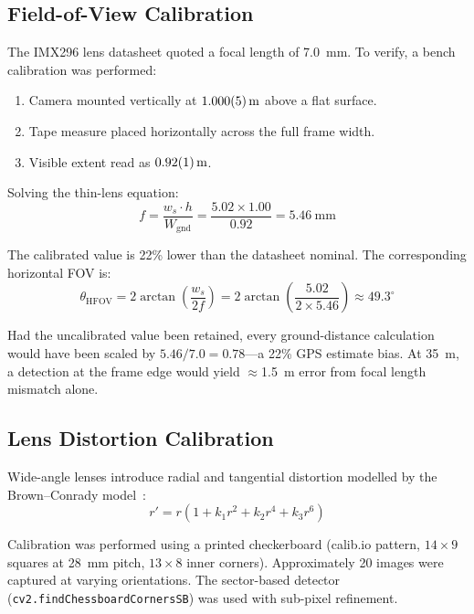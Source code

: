 \documentclass[10pt,a4paper]{article}
\begin{document}
\subsection{Field-of-View Calibration}

The IMX296 lens datasheet quoted a focal length of \SI{7.0}{\milli\metre}. To verify, a bench calibration was performed:
\begin{enumerate}
    \item Camera mounted vertically at $\SI{1.000 \pm 0.005}{\metre}$ above a flat surface.
    \item Tape measure placed horizontally across the full frame width.
    \item Visible extent read as $\SI{0.92 \pm 0.01}{\metre}$.
\end{enumerate}

Solving the thin-lens equation:
\begin{equation}
    f = \frac{w_s \cdot h}{W_{\mathrm{gnd}}} = \frac{5.02 \times 1.00}{0.92} = \SI{5.46}{\milli\metre}
\end{equation}

The calibrated value is 22\% lower than the datasheet nominal. The corresponding horizontal FOV is:
\begin{equation}
    \theta_{\mathrm{HFOV}} = 2\arctan\!\left(\frac{w_s}{2f}\right) = 2\arctan\!\left(\frac{5.02}{2 \times 5.46}\right) \approx 49.3^{\circ}
\end{equation}

Had the uncalibrated value been retained, every ground-distance calculation would have been scaled by $5.46/7.0 = 0.78$---a 22\% GPS estimate bias. At \SI{35}{\metre}, a detection at the frame edge would yield ${\approx}$\SI{1.5}{\metre} error from focal length mismatch alone.

\subsection{Lens Distortion Calibration}

Wide-angle lenses introduce radial and tangential distortion modelled by the Brown--Conrady model~\cite{brown1966decentering}:
\begin{equation}
    r' = r(1 + k_1 r^2 + k_2 r^4 + k_3 r^6)
\end{equation}

Calibration was performed using a printed checkerboard (calib.io pattern, $14 \times 9$ squares at \SI{28}{\milli\metre} pitch, $13 \times 8$ inner corners). Approximately 20 images were captured at varying orientations. The sector-based detector (\texttt{cv2.findChessboardCornersSB}) was used with sub-pixel refinement.
\end{document}
